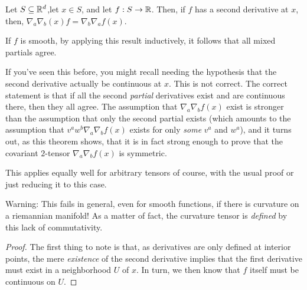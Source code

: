 \begin{thm}\label{ClariutsTheorem}
Let $S\subseteq \mathbb{R} ^d$,let $x\in S$, and let $f:S\rightarrow \mathbb{R}$.  Then, if $f$ has a second derivative at $x$, then, $\nabla _a\nabla _b(x)f=\nabla _b\nabla _af(x)$.
\begin{rmk}
If $f$ is smooth, by applying this result inductively, it follows that all mixed partials agree.
\end{rmk}
\begin{rmk}
If you've seen this before, you might recall needing the hypothesis that the second derivative actually be continuous at $x$.  This is not correct.  The correct statement is that if all the second \emph{partial} derivatives exist and are continuous there, then they all agree.  The assumption that $\nabla _a\nabla _bf(x)$ exist is stronger than the assumption that only the second partial exists (which amounts to the assumption that $v^aw^b\nabla _a\nabla _bf(x)$ exists for only \emph{some} $v^a$ and $w^a$), and it turns out, as this theorem shows, that it is in fact strong enough to prove that the covariant $2$-tensor $\nabla _a\nabla _bf(x)$ is symmetric.
\end{rmk}
\begin{rmk}
This applies equally well for arbitrary tensors of course, with the usual proof or just reducing it to this case.
\end{rmk}
\begin{rmk}
Warning:  This fails in general, even for smooth functions, if there is curvature on a riemannian manifold!  As a matter of fact, the curvature tensor is \emph{defined} by this lack of commutativity.
\end{rmk}
\begin{proof}
The first thing to note is that, as derivatives are only defined at interior points, the mere \emph{existence} of the second derivative implies that the first derivative must exist in a neighborhood $U$ of $x$.  In turn, we then know that $f$ itself must be continuous on $U$.


\end{proof}
\end{thm}
